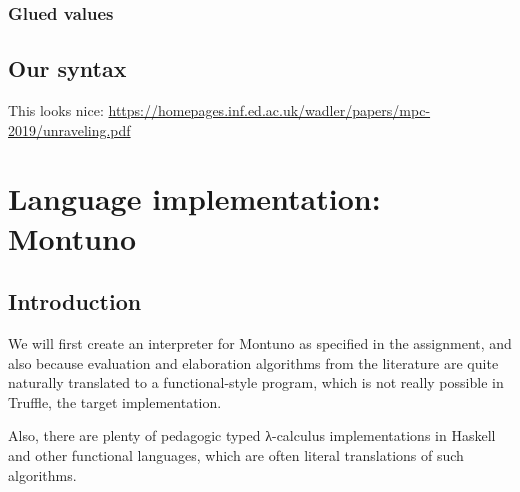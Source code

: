 \documentclass[english,zadani,odsaz]{fitthesis}
\begin{document}

\subsection{Glued values}
\label{sec:orgf90bf95}

\section{Our syntax}
\label{sec:org2d46b79}



This looks nice: \url{https://homepages.inf.ed.ac.uk/wadler/papers/mpc-2019/unraveling.pdf}

\chapter{Language implementation: Montuno}
\label{sec:orgacc5c98}
\section{Introduction}
\label{sec:org380f2d8}
We will first create an interpreter for Montuno as specified in the assignment,
and also because evaluation and elaboration algorithms from the literature are
quite naturally translated to a functional-style program, which is not really
possible in Truffle, the target implementation.


Also, there are plenty of pedagogic typed λ-calculus implementations in
Haskell and other functional languages, which are often literal translations of
such algorithms.



\end{document}
